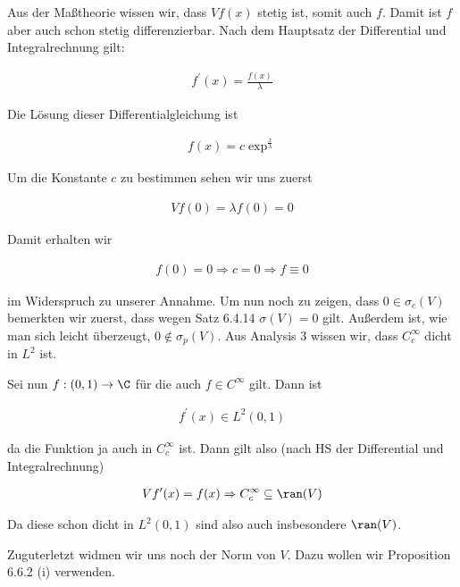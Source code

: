 \begin{solution}
Aus der Maßtheorie wissen wir, dass $Vf(x)$ stetig ist, somit auch $f$. Damit ist
$f$ aber auch schon stetig differenzierbar. Nach dem Hauptsatz der Differential und
Integralrechnung gilt:

\begin{align*}
  f^\prime (x)
  =
  \frac{f(x)}{\lambda}
\end{align*}

Die Lösung dieser Differentialgleichung ist

\begin{align*}
  f(x)
  =
  c \exp^{\frac{x}{\lambda}}
\end{align*}

Um die Konstante $c$ zu bestimmen sehen wir uns zuerst

\begin{align*}
  Vf(0) = \lambda f(0) = 0
\end{align*}

Damit erhalten wir

\begin{align*}
  f(0) = 0
  \Rightarrow
  c = 0
  \Rightarrow
  f \equiv 0
\end{align*}

im Widerspruch zu unserer Annahme. Um nun noch zu zeigen, dass $0 \in \sigma_c(V)$
bemerkten wir zuerst, dass wegen Satz 6.4.14 $\sigma(V) = {0}$ gilt. Außerdem ist,
wie man sich leicht überzeugt, $0 \notin \sigma_p(V)$. Aus Analysis 3 wissen wir, dass
$C_c^{\infty}$ dicht in $L^2$ ist.


Sei nun $f: (0,1) \rightarrow \C$ für die auch $ f \in C^{\infty}$ gilt. Dann ist

\begin{align*}
  f^\prime(x) \in L^2(0,1)
\end{align*}

da die Funktion ja auch in $C_c^{\infty}$ ist. Dann gilt also (nach HS der
Differential und Integralrechnung)

\begin{align*}
  Vf^\prime(x) = f(x)
  \Rightarrow
  C_c^{\infty} \subseteq \ran(V)
\end{align*}

Da diese schon dicht in $L^2(0,1)$ sind also auch insbesondere $\ran(V)$.

Zuguterletzt widmen wir uns noch der Norm von $V$. Dazu wollen wir Proposition
6.6.2 (i) verwenden.



\end{solution}

